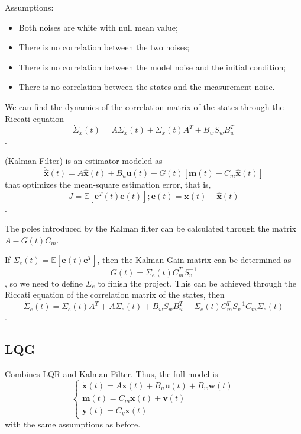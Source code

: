 \documentclass[a4paper]{report}
\begin{document}
Assumptions:
\begin{itemize}
    \item Both noises are white with null mean value;
	\item There is no correlation between the two noises;
	    \item There is no correlation between the model noise and the initial condition;
		\item There is no correlation between the states and the measurement noise.
\end{itemize}

We can find the dynamics of the correlation matrix of the states through the Riccati equation \[
\dot{\Sigma}_x(t) = A\Sigma_x(t) + \Sigma_x(t)A^{T} + B_wS_wB_w^{T}
\].

\begin{definition}
    (Kalman Filter) is an estimator modeled as \[
\dot{\bm{\hat{x}}}(t) = A\bm{\hat{x}}(t) + B_u\bm{u}(t) + G(t)\left[ \bm{m}(t) - C_m\bm{\hat{x}}(t) \right] 
\] that optimizes the mean-square estimation error, that is, \[
J = \mathbb{E}\left[ \bm{e}^{T}(t)\bm{e}(t) \right] ; \bm{e}(t) = \bm{x}(t)-\bm{\hat{x}}(t)
\].
\end{definition}

\begin{note}
    The poles introduced by the Kalman filter can be calculated through the matrix $A-G(t)C_m$.
\end{note}

If $\Sigma_e(t) = \mathbb{E}\left[ \bm{e}(t)\bm{e}^{T} \right]$, then the Kalman Gain matrix can be determined as \[
G(t) = \Sigma_e(t)C_m^{T}S_v^{-1}
\], so we need to define $\Sigma_e$ to finish the project. This can be achieved through the Riccati equation of the correlation matrix of the states, then \[
\dot{\Sigma}_e(t) = \Sigma_e(t)A^{T} + A\Sigma_e(t) + B_wS_wB_w^{T} - \Sigma_e(t)C_m^{T}S_v^{-1}C_m\Sigma_e(t)
\].

\subsection*{LQG}

Combines LQR and Kalman Filter. Thus, the full model is \[
\begin{cases}
    \dot{\bm{x}}(t) = A\bm{x}(t) + B_u\bm{u}(t) + B_w\bm{w}(t) \\
    \bm{m}(t) = C_m\bm{x}(t) + \bm{v}(t) \\
    \bm{y}(t) = C_y\bm{x}(t)
\end{cases}
\] with the same assumptions as before.
\end{document}
